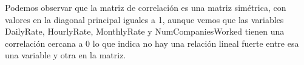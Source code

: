 Podemos observar que la matriz de correlación es una matriz simétrica, 
con valores en la diagonal principal iguales a 1, aunque vemos que las variables
DailyRate, HourlyRate, MonthlyRate y NumCompaniesWorked tienen una correlación cercana a 0
lo que indica no hay una relación lineal fuerte entre esa una variable y otra en la matriz.